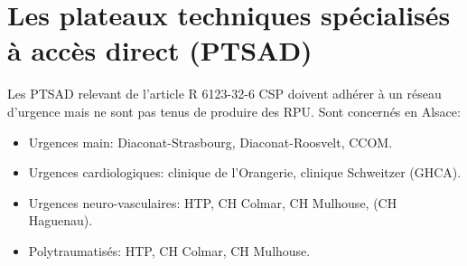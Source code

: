 \documentclass[12pt,english,french,twoside]{book}\usepackage[]{graphicx}\usepackage[]{color}
\begin{document}

\section{Les plateaux techniques spécialisés à accès direct (PTSAD)} 

Les PTSAD relevant de l'article R 6123-32-6 CSP doivent adhérer à un réseau d'urgence mais ne sont pas tenus de produire des RPU. Sont concernés en Alsace:
\begin{itemize}
\item Urgences main: Diaconat-Strasbourg, Diaconat-Roosvelt, CCOM.
\item Urgences cardiologiques: clinique de l'Orangerie, clinique Schweitzer (GHCA).
\item Urgences neuro-vasculaires: HTP, CH Colmar, CH Mulhouse, (CH Haguenau).
\item Polytraumatisés: HTP, CH Colmar, CH Mulhouse.
\end{itemize}
\end{document}

